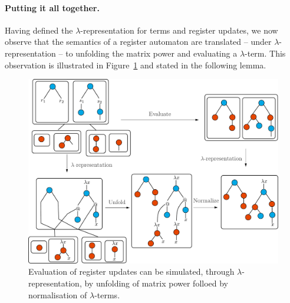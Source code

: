 \label{page:monotone-discussed}


\paragraph*{Putting it all together.}
Having defined the $\lambda$-representation for terms and register updates, we now observe  that the semantics of a register automaton are translated -- under $\lambda$-representation -- to unfolding the matrix power and evaluating a $\lambda$-term.  This observation is illustrated in Figure~\ref{fig:register-lambda} and stated in the following lemma.
\begin{figure}[]
    \centering
\includegraphics[scale=.3]{pictures/lambda-rep-diagram}   
    \caption{Evaluation of register updates can be simulated, through $\lambda$-representation, by unfolding of matrix power folloed by normalisation of $\lambda$-terms.}
    \label{fig:register-lambda}
\end{figure}



